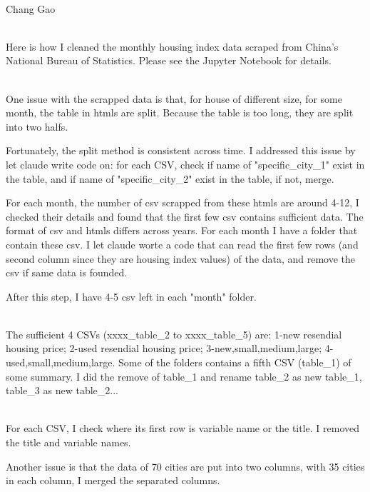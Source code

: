 \documentclass[12pt,letterpaper]{article}
\begin{document}
	\begin{center}
		\smallskip\\
		Chang Gao\smallskip\\
	\end{center}
	\medskip\\
	Here is how I cleaned the monthly housing index data scraped from China's National Bureau of Statistics. Please see the Jupyter Notebook for details.

\smallskip\\
	One issue with the scrapped data is that, for house of different size, for some month, the table in htmls are split. Because the table is too long, they are split into two halfs.
	
	Fortunately, the split method is consistent across time. I addressed this issue by let claude write code on: for each CSV, check if name of "specific\_city\_1" exist in the table, and if name of "specific\_city\_2" exist in the table, if not, merge.
	
	For each month, the number of csv scrapped from these htmls are around 4-12, I checked their details and found that the first few csv contains sufficient data. The format of csv and htmls differs across years. For each month I have a folder that contain these csv. I let claude worte a code that can read the first few rows (and second column since they are housing index values) of the data, and remove the csv if same data is founded. 
	
	After this step, I have 4-5 csv left in each "month" folder.
	
	\smallskip\\
	The sufficient 4 CSVs (xxxx\_table\_2 to xxxx\_table\_5) are: 1-new resendial housing price; 2-used resendial housing price; 3-new,small,medium,large; 4-used,small,medium,large.
	Some of the folders contains a fifth CSV (table\_1) of some summary. I did the remove of table\_1 and rename table\_2 as new table\_1, table\_3 as new table\_2...
	
		\smallskip\\
	For each CSV, I check where its first row is variable name or the title. I removed the title and variable names.
	
	Another issue is that the data of 70 cities are put into two columns, with 35 cities in each column, I merged the separated columns.
	
\end{document}
